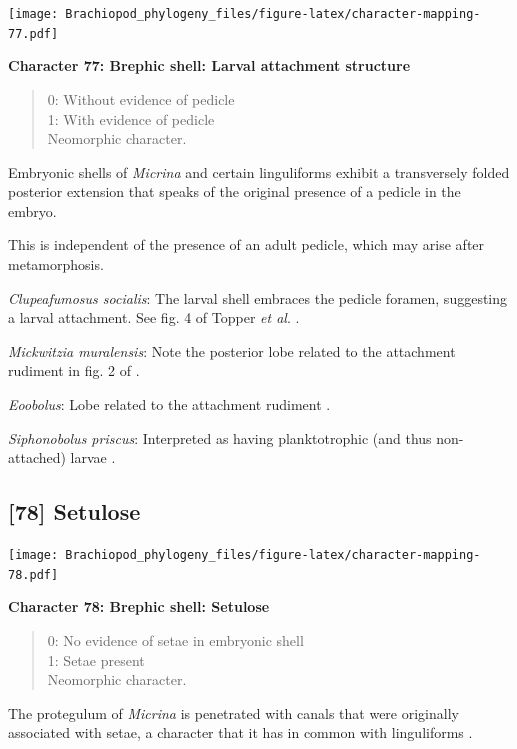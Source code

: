 \documentclass[openany]{book}
\theoremstyle{definition}
\theoremstyle{definition}
\theoremstyle{definition}
\theoremstyle{remark}
\begin{document}
\texttt{[image: Brachiopod\_phylogeny\_files/figure-latex/character-mapping-77.pdf]}

\textbf{Character 77: Brephic shell: Larval attachment structure}

\begin{quote}
0: Without evidence of pedicle\\
1: With evidence of pedicle\\
Neomorphic character.
\end{quote}

Embryonic shells of \emph{Micrina} and certain linguliforms exhibit a
transversely folded posterior extension that speaks of the original
presence of a pedicle in the embryo.

This is independent of the presence of an adult pedicle, which may arise
after metamorphosis.

\emph{Clupeafumosus socialis}: The larval shell embraces the pedicle
foramen, suggesting a larval attachment. See fig. 4 of Topper \emph{et
al}. \citeyearpar{Topper2013Reappraisalof}.

\emph{Mickwitzia muralensis}: Note the posterior lobe related to the
attachment rudiment in fig. 2 of \citet{Balthasar2009Thebrachiopod}.

\emph{Eoobolus}: Lobe related to the attachment rudiment \citep[fig.
2]{Balthasar2009Thebrachiopod}.

\emph{Siphonobolus priscus}: Interpreted as having planktotrophic (and
thus non-attached) larvae \citep{Popov2009Earlyontogeny}.

\hypertarget{setulose}{%
\subsection*{{[}78{]} Setulose}\label{setulose}}

\texttt{[image: Brachiopod\_phylogeny\_files/figure-latex/character-mapping-78.pdf]}

\textbf{Character 78: Brephic shell: Setulose}

\begin{quote}
0: No evidence of setae in embryonic shell\\
1: Setae present\\
Neomorphic character.
\end{quote}

The protegulum of \emph{Micrina} is penetrated with canals that were
originally associated with setae, a character that it has in common with
linguliforms \citep{Holmer2011Firstrecord}.
\end{document}
